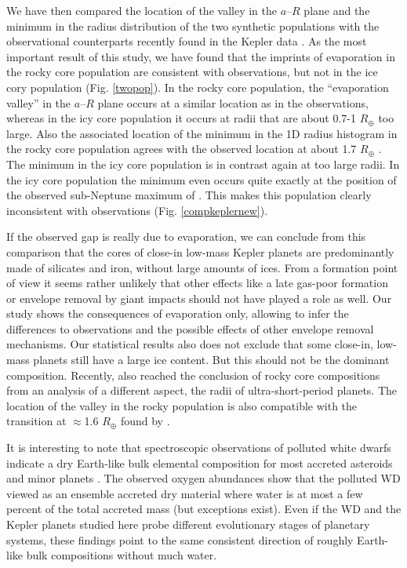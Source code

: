 \documentclass[]{emulateapj}
\def\rearth{R_{\oplus}}
\begin{document}
We have then compared the location of the valley in the $a$--$R$ plane and the minimum in the radius distribution of the two synthetic populations with the observational counterparts recently found in the Kepler data  \citep{Fulton2017}. As the most important result of this study, we have found that the  imprints of evaporation in the rocky core population are consistent with observations, but not in the ice cory population (Fig. \ref{twopop}). In the rocky core population, the ``evaporation valley'' in the $a$--$R$ plane occurs at a similar location as in the observations, whereas in the icy core population it occurs at radii that are about 0.7-1 $\rearth$ too large. Also the associated location of the minimum in the {1D} radius histogram in the rocky core population agrees with the observed location at about 1.7 $\rearth$ \citep[][]{Fulton2017}. The minimum in the icy core population is in contrast again at too large radii. In the icy core population the minimum even occurs quite exactly at the position of the observed sub-Neptune maximum of \citet{Fulton2017}. This makes this population clearly inconsistent with observations (Fig. \ref{compkeplernew}).

If the observed gap is really due to evaporation, we can conclude from this comparison that the cores of close-in low-mass Kepler planets are predominantly made of silicates and iron, without large amounts of ices. From a formation point of view it seems rather unlikely that other effects like a late gas-poor formation \citep{Lee2014,LopezRice2016} or envelope removal by giant impacts \citep[e.g.,][]{Schlichting2015} should not have played a role as well. Our study shows the consequences of evaporation only, allowing to infer the differences to observations and the possible effects of other envelope removal mechanisms. 
Our statistical results also does not exclude that some close-in, low-mass planets still have a large ice content. But this should not be the dominant composition. Recently, \citet{Lopez2016} also reached the conclusion of rocky core compositions from an analysis of a different aspect, the radii of ultra-short-period planets. The location of the valley in the rocky population is also compatible with the transition at $\approx$1.6 $\rearth$  found by \citet{Rogers2015}. 

{It is interesting to note that spectroscopic observations of polluted white dwarfs indicate a dry Earth-like bulk elemental composition for most accreted asteroids and minor planets \citep{Jura2014,Xu2014}. The observed oxygen abundances show that the polluted WD viewed as an ensemble accreted dry material where water is at most a few percent of the total accreted mass (but exceptions exist). Even if the WD and the Kepler planets studied here probe different evolutionary stages of planetary systems, these findings point to the same consistent direction of roughly Earth-like bulk compositions without much water.} 
\end{document}
